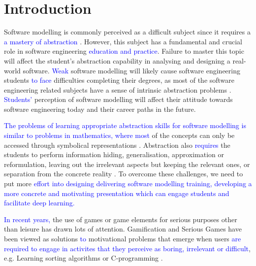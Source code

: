 \documentclass[runningheads,a4paper]{llncs}
\begin{document}
\section{Introduction}
Software modelling is commonly perceived as a difficult subject since it requires a \textcolor{blue}{a mastery of abstraction} \cite{Borstler2012}. However, this subject has a fundamental and crucial role in software engineering \textcolor{blue}{education and practice}. Failure to master this topic will affect the student’s abstraction capability in analysing and designing a real-world software. \textcolor{blue}{Weak} software modelling will likely cause software engineering students \textcolor{blue}{to face} difficulties completing their degrees, as most of the software engineering related subjects have a sense of intrinsic abstraction problems \cite{Kramer2007}. \textcolor{blue}{Students'} perception of software modelling will affect their attitude towards software engineering today and their career paths in the future.

\textcolor{blue}{The problems of learning appropriate abstraction skills for software modelling is similar to problems in mathematics, where most} of the concepts can only be accessed through symbolical representations \cite{Duval2006}. Abstraction also \textcolor{blue}{requires} the students to perform information hiding, generalisation, approximation or reformulation, leaving out the irrelevant aspects but keeping the relevant ones, or separation from the concrete reality \cite{Saitta2013}. To overcome these challenges, we need to put more \textcolor{blue}{effort into designing delivering software modelling training, developing a more concrete and motivating presentation which can engage students and facilitate deep learning.}

\textcolor{blue}{In recent years, }the use of games or game elements for serious purposes other than leisure has drawn lots of attention. Gamification \cite{deterding2011game} and Serious Games \cite{Michael2005} have been viewed as solutions \textcolor{blue}{to} motivational problems that emerge when users \textcolor{blue}{are required to engage in activites that they perceive as boring, irrelevant or difficult}, e.g. Learning sorting algorithms \cite{Yohannis2015} or C-programming \cite{Ibanez2014}.
\end{document}
